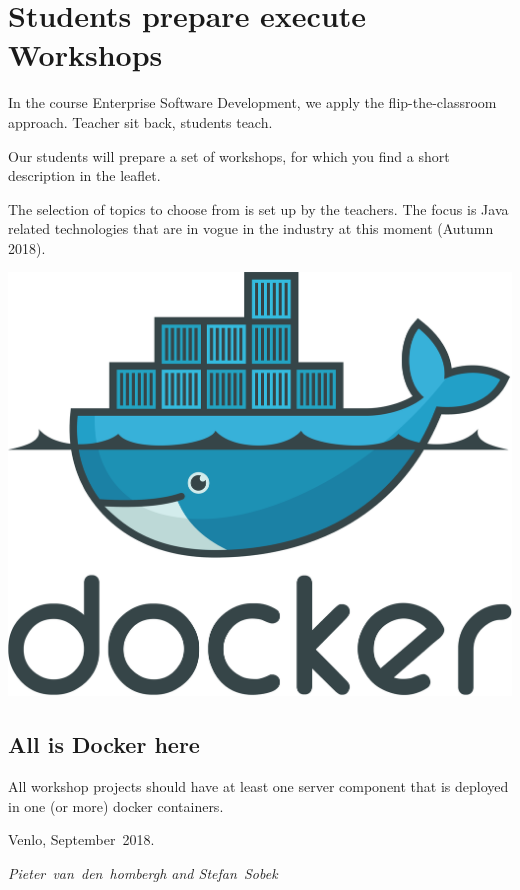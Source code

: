 \section*{Students prepare execute Workshops}
In the course Enterprise Software Development, we apply the
flip-the-classroom approach. Teacher sit back, students teach. 

Our students will prepare a set of workshops, for which you find a short
description in the leaflet.

The selection of topics to choose from is set up by the teachers. The
focus is Java related technologies that are in vogue in the industry
at this moment (Autumn 2018).

\hfill\includegraphics[width=.4\linewidth]{images/docker.pdf}

\subsection*{All is Docker here}
All workshop projects should have at least one server component that is deployed
in one (or more)  docker containers. 

Venlo, September~2018.

\hfill\textit{Pieter~van~den~hombergh and Stefan~Sobek} 
